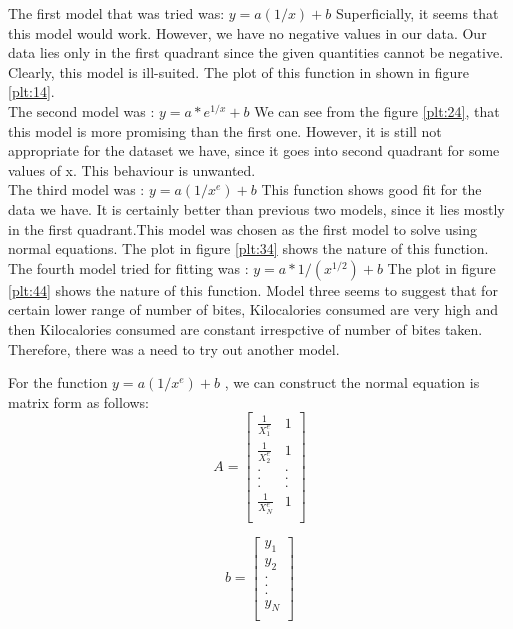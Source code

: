 \documentclass{article}
\begin{document}
\newpage
The first model that was tried was: $y=a(1/x)+ b$
Superficially, it seems that this model would work. However, we have no negative values in our data. Our data lies only in the first quadrant since the given quantities cannot be negative. Clearly, this model is ill-suited. The plot of this function in shown in figure \ref{plt:14}.\\
The second model was : $y=a*e^{1/x}+ b$
We can see from the figure \ref{plt:24}, that this model is more promising than the first one. However, it is still not appropriate for the dataset we have, since it goes into second quadrant for some values of x. This behaviour is unwanted.\\
The third model was : $y=a(1/x^{e})+ b$
This function shows good fit for the data we have. It is certainly better than previous two models, since it lies mostly in the first quadrant.This model was chosen as the first model to solve using normal equations. The plot in figure \ref{plt:34} shows the nature of this function.\\
The fourth model tried for fitting was : $y=a*1/(x^{1/2}) + b$
The plot in figure \ref{plt:44} shows the nature of this function. Model three seems to suggest that for certain lower range of number of bites, Kilocalories consumed are very high and then Kilocalories consumed are constant irrespctive of number of bites taken. Therefore, there was a need to try out another model.

For the function $y=a(1/x^{e})+ b$ , we can construct the normal equation is matrix form as follows:
\begin{equation}
A=
\begin{bmatrix}
\frac{1}{X_1^e}&1\\
\frac{1}{X_2^e}&1\\
.&.\\
.&.\\
.&.\\
\frac{1}{X_N^e}&1\\
\end{bmatrix}
\end{equation}

\begin{equation}
b=
\begin{bmatrix}
y_1\\
y_2\\
.\\
.\\
.\\
y_N\\
\end{bmatrix}
\end{equation}
\end{document}
